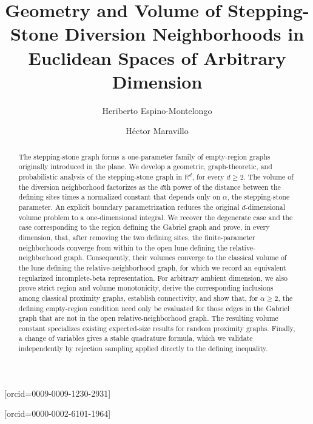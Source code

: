 \documentclass[a4paper,fleqn]{cas-dc}
\theoremstyle{definition}
\theoremstyle{remark}
\newcommand{\R}{\mathds{R}}
\newcommand{\0}{\mathbf{0}}
\begin{document}
\let\WriteBookmarks\relax
\def\floatpagepagefraction{1}
\def\textpagefraction{.001}


\title[mode=title]{Geometry and Volume of Stepping-Stone Diversion Neighborhoods in Euclidean Spaces of Arbitrary Dimension}

\author[1]{Heriberto Espino-Montelongo}
    [orcid=0009-0009-1230-2931]
\cormark[1]


\author[2]{H\'ector Maravillo}
    [orcid=0000-0002-6101-1964]




\begin{abstract}
The stepping-stone graph forms a one-parameter family of empty-region graphs originally introduced in the plane.
We develop a geometric, graph-theoretic, and
probabilistic analysis of the stepping-stone graph in
\(\R^d\), for every \(d\geq2\).
The volume of the diversion neighborhood 
factorizes as the \(d\)th power of
the distance between the defining sites times a 
normalized constant that depends only on $\alpha$, 
the stepping-stone parameter.
An explicit boundary parametrization reduces
the original \(d\)-dimensional volume problem to a one-dimensional integral.
We recover the degenerate case and the case corresponding to the region
defining the Gabriel graph
and prove, in every dimension,
that, after removing the two defining sites, the finite-parameter
neighborhoods converge from within to 
the open lune defining the relative-neighborhood
graph.
Consequently, their volumes converge to the classical
volume of the lune defining the 
relative-neighborhood graph, for which we record an equivalent regularized
incomplete-beta representation. For arbitrary ambient dimension, we also
prove strict region and volume monotonicity, derive the
corresponding inclusions among classical proximity graphs, establish
connectivity, and show that, for $\alpha\geq2$, the defining empty-region
condition need only be evaluated for 
those edges in the Gabriel graph 
that are not in the open relative-neighborhood graph.
The resulting volume constant specializes
existing expected-size results for random proximity graphs. Finally, a
 change of variables gives a stable quadrature formula, 
 which we validate independently
by rejection sampling applied directly to the
defining inequality.

\end{abstract}
\end{document}
